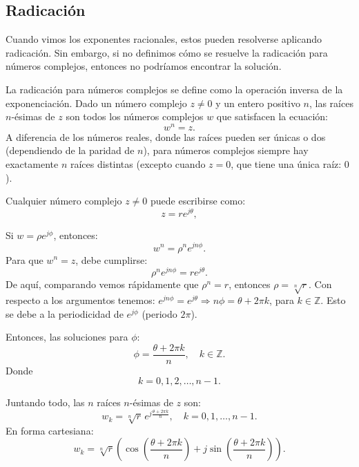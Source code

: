 \subsection{Radicación}

Cuando vimos los exponentes racionales, estos pueden resolverse aplicando radicación. Sin embargo, si no definimos cómo se resuelve la radicación para números complejos, entonces no podríamos encontrar la solución.

La radicación para números complejos se define como la operación inversa de la exponenciación. Dado un número complejo \( z \neq 0 \) y un entero positivo \( n \), las raíces \( n \)-ésimas de \( z \) son todos los números complejos \( w \) que satisfacen la ecuación:
\[
w^n = z.
\]
A diferencia de los números reales, donde las raíces pueden ser únicas o dos (dependiendo de la paridad de \( n \)), para números complejos siempre hay exactamente \( n \) raíces distintas (excepto cuando \( z = 0 \), que tiene una única raíz: \( 0 \)).

Cualquier número complejo \( z \neq 0 \) puede escribirse como:
\[
 z = r e^{j\theta},
\]

Si \( w = \rho e^{j\phi} \), entonces:
\[
 w^n = \rho^n e^{j n \phi}.
\]
Para que \( w^n = z \), debe cumplirse:
\[
 \rho^n e^{j n \phi} = r e^{j\theta}.
\]
De aquí, comparando vemos rápidamente que $\rho^n=r$, entonces $\rho=\sqrt[n]{r}$. Con respecto a los argumentos tenemos: \( e^{j n \phi} = e^{j\theta} \Rightarrow n\phi = \theta + 2\pi k \), para \( k \in \mathbb{Z} \). Esto se debe a la periodicidad de \( e^{j\phi} \) (periodo \( 2\pi \)).

Entonces, las soluciones para \( \phi \):
\[
\phi = \frac{\theta + 2\pi k}{n}, \quad k \in \mathbb{Z}.
\]
Donde 
\[
k = 0, 1, 2, \dots, n-1.
\]

Juntando todo, las \( n \) raíces \( n \)-ésimas de \( z \) son:
\[
w_k = \sqrt[n]{r} \, e^{j \frac{\theta + 2\pi k}{n}}, \quad k = 0, 1, \dots, n-1.
\]
En forma cartesiana:
\[
w_k = \sqrt[n]{r} \left( \cos\left( \frac{\theta + 2\pi k}{n} \right) + j \sin\left( \frac{\theta + 2\pi k}{n} \right) \right).
\]

